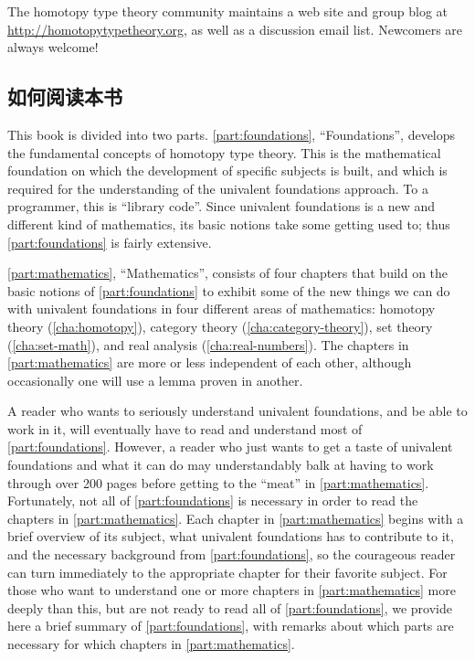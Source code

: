 The homotopy type theory community maintains a web site and group blog at \url{http://homotopytypetheory.org}, as well as a discussion email list.
Newcomers are always welcome!


\subsection*{如何阅读本书}

This book is divided into two parts.
\cref{part:foundations}, ``Foundations'', develops the fundamental concepts of homotopy type theory.
This is the mathematical foundation on which the development of specific subjects is built, and which is required for the understanding of the univalent foundations approach. To a programmer, this is ``library code''.
Since univalent foundations is a new and different kind of mathematics, its basic notions take some getting used to; thus \cref{part:foundations} is fairly extensive.

\cref{part:mathematics}, ``Mathematics'', consists of four chapters that build on the basic notions of \cref{part:foundations} to exhibit some of the new things we can do with univalent foundations in four different areas of mathematics: homotopy theory (\cref{cha:homotopy}), category theory (\cref{cha:category-theory}), set theory (\cref{cha:set-math}), and real analysis (\cref{cha:real-numbers}).
The chapters in \cref{part:mathematics} are more or less independent of each other, although occasionally one will use a lemma proven in another.

A reader who wants to seriously understand univalent foundations, and be able to work in it, will eventually have to read and understand most of \cref{part:foundations}.
However, a reader who just wants to get a taste of univalent foundations and what it can do may understandably balk at having to work through over 200 pages before getting to the ``meat'' in \cref{part:mathematics}.
Fortunately, not all of \cref{part:foundations} is necessary in order to read the chapters in \cref{part:mathematics}.
Each chapter in \cref{part:mathematics} begins with a brief overview of its subject, what univalent foundations has to contribute to it, and the necessary background from \cref{part:foundations}, so the courageous reader can turn immediately to the appropriate chapter for their favorite subject.
For those who want to understand one or more chapters in \cref{part:mathematics} more deeply than this, but are not ready to read all of \cref{part:foundations}, we provide here a brief summary of \cref{part:foundations}, with remarks about which parts are necessary for which chapters in \cref{part:mathematics}.

